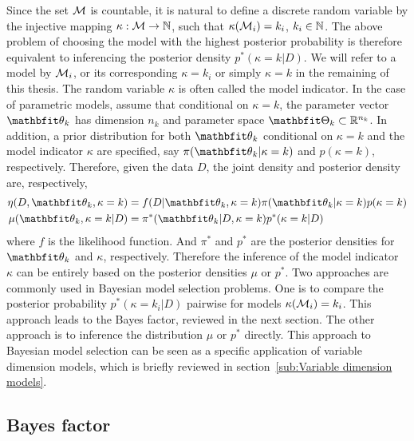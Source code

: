 \documentclass[11pt, hyper, bib, fontset=Minion]{marticle}
\begin{document}
Since the set $\mathcal{M}$ is countable, it is natural to define a discrete random
variable by the injective mapping $\kappa:\mathcal{M}\to\mathbb{N}$, such that
$\kappa(\mathcal{M}_i) = k_i$, $k_i \in \mathbb{N}$. The above problem of choosing the
model with the highest posterior probability is therefore equivalent to
inferencing the posterior density $p^*(\kappa = k|D)$. We will refer to a
model by $\mathcal{M}_i$, or its corresponding $\kappa = k_i$ or simply $\kappa = k$
in the remaining of this thesis. The random variable $\kappa$ is often called
the model indicator. In the case of parametric models, assume that conditional
on $\kappa = k$, the parameter vector $\bth_k$ has dimension $n_k$ and
parameter space $\bTh_k\subset\bbR^{n_k}$. In addition, a prior distribution
for both $\bth_k$ conditional on $\kappa = k$ and the model indicator $\kappa$
are specified, say $\pi(\bth_k|\kappa =k)$ and $p(\kappa = k)$, respectively.
Therefore, given the data $D$, the joint density and posterior density are,
respectively,
\begin{align}
  \eta(D,\bth_k,\kappa=k)
  &= f(D|\bth_k,\kappa=k)\pi(\bth_k|\kappa=k)p(\kappa=k)
  \label{eq:full joint}\\
  \mu(\bth_k,\kappa=k|D)
  &= \pi^*(\bth_k|D,\kappa=k)p^*(\kappa=k|D)
  \label{eq:full posterior}
\end{align}
where $f$ is the likelihood function. And $\pi^*$ and $p^*$ are the posterior
densities for $\bth_k$ and $\kappa$, respectively. Therefore the inference of
the model indicator $\kappa$ can be entirely based on the posterior densities
$\mu$ or $p^*$. Two approaches are commonly used in Bayesian model selection
problems. One is to compare the posterior probability $p^*(\kappa=k_i|D)$
pairwise for models $\kappa(\mathcal{M}_i) = k_i$. This approach leads to the Bayes
factor, reviewed in the next section. The other approach is to inference the
distribution $\mu$ or $p^*$ directly. This approach to Bayesian model
selection can be seen as a specific application of variable dimension models,
which is briefly reviewed in section~\ref{sub:Variable dimension models}.

\subsection{Bayes factor}
\label{sub:Bayes factor}
\end{document}
